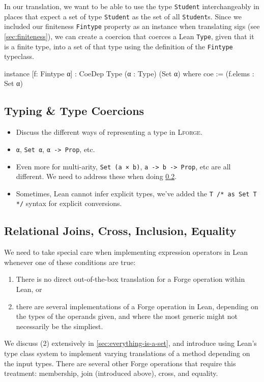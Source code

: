 In our translation, we want to be able to use the type \texttt{Student} interchangeably in places that expect a set of type \texttt{Student} as the set of all \texttt{Student}s. Since we included our finiteness \texttt{Fintype} property as an instance when translating sigs (see \cref{sec:finiteness}), we can create a coercion that coerces a Lean \texttt{Type}, given that it is a finite type, into a set of that type using the definition of the \texttt{Fintype} typeclass. 
\begin{leanimpl*}
instance [f: Fintype α] : CoeDep Type (α : Type) (Set α) where
  coe := (f.elems : Set α)
\end{leanimpl*}

\subsection{Typing \& Type Coercions}\label{sec:type-coercions}
{\color{OliveGreen}
\begin{itemize}
  \item Discuss the different ways of representing a type in \textsc{Lforge}.
  \item \texttt{α}, \texttt{Set α}, \texttt{α -> Prop}, etc. 
  \item Even more for multi-arity, \texttt{Set (a × b)}, \texttt{a -> b -> Prop}, etc are all different. We need to address these when doing \cref{sec:join-cross-subset}. 
  \item Sometimes, Lean cannot infer explicit types, we've added the \texttt{T /* as Set T */} syntax for explicit conversions. 
\end{itemize}}

\subsection{Relational Joins, Cross, Inclusion, Equality}\label{sec:join-cross-subset}

We need to take special care when implementing expression operators in Lean whenever one of these conditions are true: 
\begin{enumerate}[(1)]
  \item There is no direct out-of-the-box translation for a Forge operation within Lean, or
  \item there are several implementations of a Forge operation in Lean, depending on the types of the operands given, and where the most generic might not necessarily be the simpliest. 
\end{enumerate}
We discuss (2) extensively in \cref{sec:everything-is-a-set}, and introduce using Lean's type class system to implement varying translations of a method depending on the input types. There are several other Forge operations that require this treatment: membership, join (introduced above), cross, and equality. 

